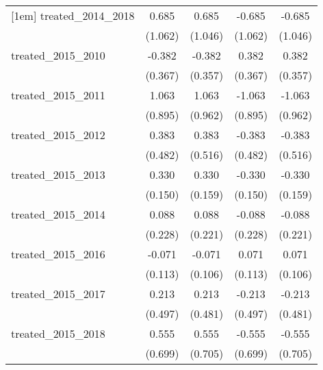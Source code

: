 {\begin{tabular}{l*{4}{c}}
[1em]
treated\_2014\_2018&       0.685         &       0.685         &      -0.685         &      -0.685         \\
            &     (1.062)         &     (1.046)         &     (1.062)         &     (1.046)         \\
[1em]
treated\_2015\_2010&      -0.382         &      -0.382         &       0.382         &       0.382         \\
            &     (0.367)         &     (0.357)         &     (0.367)         &     (0.357)         \\
[1em]
treated\_2015\_2011&       1.063         &       1.063         &      -1.063         &      -1.063         \\
            &     (0.895)         &     (0.962)         &     (0.895)         &     (0.962)         \\
[1em]
treated\_2015\_2012&       0.383         &       0.383         &      -0.383         &      -0.383         \\
            &     (0.482)         &     (0.516)         &     (0.482)         &     (0.516)         \\
[1em]
treated\_2015\_2013&       0.330\sym{*}  &       0.330\sym{*}  &      -0.330\sym{*}  &      -0.330\sym{*}  \\
            &     (0.150)         &     (0.159)         &     (0.150)         &     (0.159)         \\
[1em]
treated\_2015\_2014&       0.088         &       0.088         &      -0.088         &      -0.088         \\
            &     (0.228)         &     (0.221)         &     (0.228)         &     (0.221)         \\
[1em]
treated\_2015\_2016&      -0.071         &      -0.071         &       0.071         &       0.071         \\
            &     (0.113)         &     (0.106)         &     (0.113)         &     (0.106)         \\
[1em]
treated\_2015\_2017&       0.213         &       0.213         &      -0.213         &      -0.213         \\
            &     (0.497)         &     (0.481)         &     (0.497)         &     (0.481)         \\
[1em]
treated\_2015\_2018&       0.555         &       0.555         &      -0.555         &      -0.555         \\
            &     (0.699)         &     (0.705)         &     (0.699)         &     (0.705)         \\

\end{tabular}}
